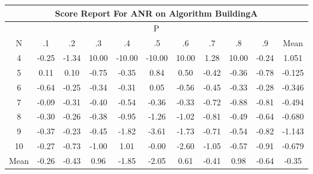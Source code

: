 \documentclass[11pt,a4paper]{report}
\begin{document}
\begin{longtable}{ | c || c | c | c | c | c | c | c | c | c || c |}
\hline
\multicolumn{11}{|c|}{ Score Report For ANR on Algorithm BuildingA} \\
\hline
\multicolumn{11}{|c|}{ P } \\
\hline
N & .1 & .2 & .3 & .4 & .5 & .6 & .7 & .8 & .9 & Mean\\
 \hline
 \hline
 \endhead
  4 &  \cellcolor[HTML]{FFF7F7} -0.25 &  \cellcolor[HTML]{FFDFDF} -1.34 &  \cellcolor[HTML]{0808FF} 10.00 &  \cellcolor[HTML]{FF0000} -10.00 &  \cellcolor[HTML]{FF0000} -10.00 &  \cellcolor[HTML]{0808FF} 10.00 &  \cellcolor[HTML]{DFDFFF} 1.28 &  \cellcolor[HTML]{0808FF} 10.00 &  \cellcolor[HTML]{FFF7F7} -0.24 & 1.051 \\
  5 &  \cellcolor[HTML]{FFFFFF} 0.11 &  \cellcolor[HTML]{FFFFFF} 0.10 &  \cellcolor[HTML]{FFEFEF} -0.75 &  \cellcolor[HTML]{FFF7F7} -0.35 &  \cellcolor[HTML]{E7E7FF} 0.84 &  \cellcolor[HTML]{EFEFFF} 0.50 &  \cellcolor[HTML]{FFF7F7} -0.42 &  \cellcolor[HTML]{FFF7F7} -0.36 &  \cellcolor[HTML]{FFEFEF} -0.78 & -0.125 \\
  6 &  \cellcolor[HTML]{FFEFEF} -0.64 &  \cellcolor[HTML]{FFF7F7} -0.25 &  \cellcolor[HTML]{FFF7F7} -0.34 &  \cellcolor[HTML]{FFF7F7} -0.31 &  \cellcolor[HTML]{FFFFFF} 0.05 &  \cellcolor[HTML]{FFEFEF} -0.56 &  \cellcolor[HTML]{FFF7F7} -0.45 &  \cellcolor[HTML]{FFF7F7} -0.33 &  \cellcolor[HTML]{FFF7F7} -0.28 & -0.346 \\
  7 &  \cellcolor[HTML]{FFFFFF} -0.09 &  \cellcolor[HTML]{FFF7F7} -0.31 &  \cellcolor[HTML]{FFF7F7} -0.40 &  \cellcolor[HTML]{FFEFEF} -0.54 &  \cellcolor[HTML]{FFF7F7} -0.36 &  \cellcolor[HTML]{FFF7F7} -0.33 &  \cellcolor[HTML]{FFEFEF} -0.72 &  \cellcolor[HTML]{FFE7E7} -0.88 &  \cellcolor[HTML]{FFE7E7} -0.81 & -0.494 \\
  8 &  \cellcolor[HTML]{FFF7F7} -0.30 &  \cellcolor[HTML]{FFF7F7} -0.26 &  \cellcolor[HTML]{FFF7F7} -0.38 &  \cellcolor[HTML]{FFE7E7} -0.95 &  \cellcolor[HTML]{FFDFDF} -1.26 &  \cellcolor[HTML]{FFE7E7} -1.02 &  \cellcolor[HTML]{FFE7E7} -0.81 &  \cellcolor[HTML]{FFEFEF} -0.49 &  \cellcolor[HTML]{FFEFEF} -0.64 & -0.680 \\
  9 &  \cellcolor[HTML]{FFF7F7} -0.37 &  \cellcolor[HTML]{FFF7F7} -0.23 &  \cellcolor[HTML]{FFF7F7} -0.45 &  \cellcolor[HTML]{FFCFCF} -1.82 &  \cellcolor[HTML]{FFA7A7} -3.61 &  \cellcolor[HTML]{FFD7D7} -1.73 &  \cellcolor[HTML]{FFEFEF} -0.71 &  \cellcolor[HTML]{FFEFEF} -0.54 &  \cellcolor[HTML]{FFE7E7} -0.82 & -1.143 \\
  10 &  \cellcolor[HTML]{FFF7F7} -0.27 &  \cellcolor[HTML]{FFEFEF} -0.73 &  \cellcolor[HTML]{FFE7E7} -1.00 &  \cellcolor[HTML]{E7E7FF} 1.01 &  \cellcolor[HTML]{FFFFFF} -0.00 &  \cellcolor[HTML]{FFBFBF} -2.60 &  \cellcolor[HTML]{FFE7E7} -1.05 &  \cellcolor[HTML]{FFEFEF} -0.57 &  \cellcolor[HTML]{FFE7E7} -0.91 & -0.679 \\
 \hline
 \hline
Mean &  \cellcolor[HTML]{FFF7F7} -0.26 &  \cellcolor[HTML]{FFF7F7} -0.43 &  \cellcolor[HTML]{E7E7FF} 0.96 &  \cellcolor[HTML]{FFCFCF} -1.85 &  \cellcolor[HTML]{FFCFCF} -2.05 &  \cellcolor[HTML]{EFEFFF} 0.61 &  \cellcolor[HTML]{FFF7F7} -0.41 &  \cellcolor[HTML]{E7E7FF} 0.98 &  \cellcolor[HTML]{FFEFEF} -0.64 &  \cellcolor[HTML]{FFF7F7} -0.35
\end{longtable}
\end{document}

